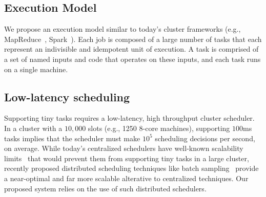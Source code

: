 \subsection{Execution Model}
We propose an execution model similar to today's cluster frameworks (e.g.,
MapReduce~\cite{??}, Spark~\cite{??}). Each job is composed of a large number
of tasks that each represent an indivisible and idempotent unit of
execution. A task is comprised of a set of named
inputs and code that operates on these inputs, and each task runs on a single
machine.

\subsection{Low-latency scheduling}
Supporting tiny tasks requires a low-latency, high throughput cluster scheduler.
In a cluster with a $10,000$ slots (e.g., 1250 8-core machines),
supporting $100$ms tasks implies that the scheduler must make $10^5$ scheduling
decisions per second, on average.
While today's centralized schedulers have well-known scalability
limits~\cite{wilkesberkeley} that
would prevent them from supporting tiny tasks in a large cluster,
recently proposed distributed scheduling techniques like batch
sampling~\cite{ousterhoutbatch} provide a near-optimal and far more scalable
alterative to centralized techniques.
Our proposed system relies on the use of such distributed schedulers.


